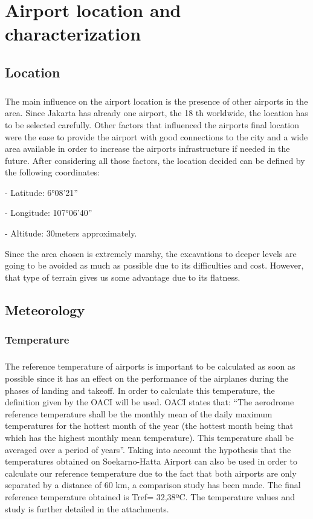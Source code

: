 \chapter{Airport location and characterization}
	\section{Location}
\paragraph{} The main influence on the airport location is the presence of other airports in the area. Since
Jakarta has already one airport, the 18 th worldwide, the location has to be selected carefully.
Other factors that influenced the airports final location were the ease to provide the airport
with good connections to the city and a wide area available in order to increase the airports
infrastructure if needed in the future.
After considering all those factors, the location decided can be defined by the following coordinates:

- Latitude: 6°08'21''

- Longitude: 107°06'40''

- Altitude: 30meters approximately.

Since the area chosen is extremely marshy, the excavations to deeper levels are going to be
avoided as much as possible due to its difficulties and cost. However, that type of terrain gives
us some advantage due to its flatness.
	\section{Meteorology}
		\subsection{Temperature}
		\paragraph{}The reference temperature of airports is important to be calculated as soon as possible since it has an effect on the performance of the airplanes during the phases of landing and takeoff. 
		In order to calculate this temperature, the definition given by the OACI will be used. OACI states that: “The aerodrome reference temperature shall be the monthly mean of the daily maximum temperatures for the hottest month of the year (the hottest month being that which has the highest monthly mean temperature). This temperature shall be averaged over a period of years”.
		Taking into account the hypothesis that the temperatures obtained on Soekarno-Hatta Airport can also be used in order to calculate our reference temperature due to the fact that both airports are only separated by a distance of 60 km, a comparison study has been made. 
		The final reference temperature obtained is Tref= 32,38ºC. 
		The temperature values and study is further detailed in the attachments.
		
